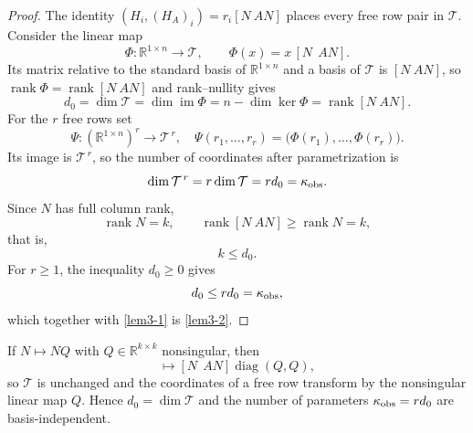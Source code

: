 \begin{proof}
The identity $(H_i,(H_A)_i)=r_i[N\ AN]$ places every free row pair in $\mathcal T$. Consider the linear map
\begin{equation*}
\Phi:\mathbb R^{1\times n}\to\mathcal T,\qquad \Phi(x)=x\,[N\ \ AN].
\end{equation*}
Its matrix relative to the standard basis of $\mathbb R^{1\times n}$ and a basis of $\mathcal T$ is $[N\ AN]$, so $\operatorname{rank}\Phi=\operatorname{rank}[N\ AN]$ and rank--nullity gives
\begin{equation*}
d_0=\dim\mathcal T=\dim\operatorname{im}\Phi=n-\dim\ker\Phi=\operatorname{rank}[N\ AN].
\end{equation*}
For the $r$ free rows set
\begin{equation*}
\Psi:(\mathbb R^{1\times n})^r\to\mathcal T^{\,r},\quad
\Psi(r_1,\dots,r_r)=\bigl(\Phi(r_1),\dots,\Phi(r_r)\bigr).
\end{equation*}
Its image is $\mathcal T^{\,r}$, so the number of coordinates after parametrization is
\begin{equation*}
\dim\mathcal T^{\,r}=r\dim\mathcal T=rd_0=\kappa_{\rm obs}.
\end{equation*}
Since $N$ has full column rank,
\begin{equation*}
\operatorname{rank}N=k,\qquad \operatorname{rank}[N\ AN]\ge\operatorname{rank}N=k,
\end{equation*}
that is,
\begin{equation}\label{lem3-1}
k\le d_0 .
\end{equation}
For $r\ge1$, the inequality $d_0\ge0$ gives
\begin{equation*}
d_0\le rd_0=\kappa_{\rm obs},
\end{equation*}
which together with \eqref{lem3-1} is \eqref{lem3-2}.
\end{proof}

\begin{remark}
If $N\mapsto NQ$ with $Q\in\mathbb R^{k\times k}$ nonsingular, then
\begin{equation*}
[N\ \ AN]\mapsto[N\ \ AN]\operatorname{diag}(Q,Q),
\end{equation*}
so $\mathcal T$ is unchanged and the coordinates of a free row transform by the nonsingular linear map $Q$. Hence $d_0=\dim\mathcal T$ and the number of parameters $\kappa_{\rm obs}=rd_0$ are basis-independent.
\end{remark}
